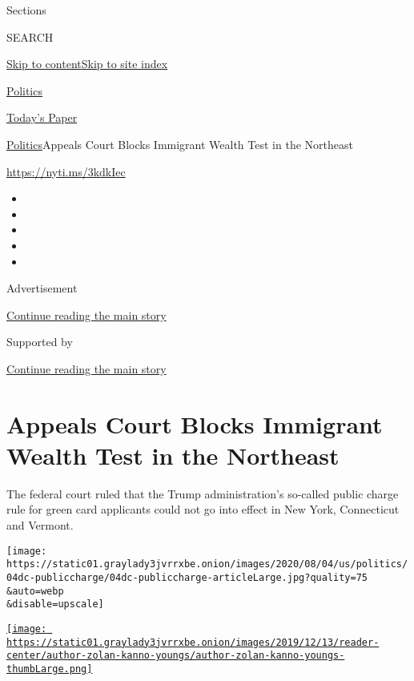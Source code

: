Sections

SEARCH

\protect\hyperlink{site-content}{Skip to
content}\protect\hyperlink{site-index}{Skip to site index}

\href{https://www.nytimes3xbfgragh.onion/section/politics}{Politics}

\href{https://myaccount.nytimes3xbfgragh.onion/auth/login?response_type=cookie\&client_id=vi}{}

\href{https://www.nytimes3xbfgragh.onion/section/todayspaper}{Today's
Paper}

\href{/section/politics}{Politics}\textbar{}Appeals Court Blocks
Immigrant Wealth Test in the Northeast

\url{https://nyti.ms/3kdkIec}

\begin{itemize}
\item
\item
\item
\item
\item
\end{itemize}

Advertisement

\protect\hyperlink{after-top}{Continue reading the main story}

Supported by

\protect\hyperlink{after-sponsor}{Continue reading the main story}

\hypertarget{appeals-court-blocks-immigrant-wealth-test-in-the-northeast}{%
\section{Appeals Court Blocks Immigrant Wealth Test in the
Northeast}\label{appeals-court-blocks-immigrant-wealth-test-in-the-northeast}}

The federal court ruled that the Trump administration's so-called public
charge rule for green card applicants could not go into effect in New
York, Connecticut and Vermont.

\texttt{[image: https://static01.graylady3jvrrxbe.onion/images/2020/08/04/us/politics/04dc-publiccharge/04dc-publiccharge-articleLarge.jpg?quality=75\\\&auto=webp\\\&disable=upscale]}

\href{https://www.nytimes3xbfgragh.onion/by/zolan-kanno-youngs}{\texttt{[image: https://static01.graylady3jvrrxbe.onion/images/2019/12/13/reader-center/author-zolan-kanno-youngs/author-zolan-kanno-youngs-thumbLarge.png]}}

